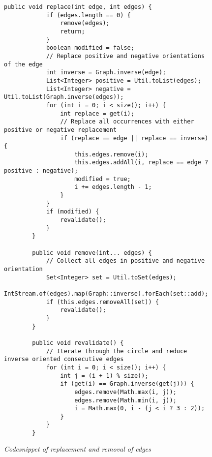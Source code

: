 \lstset{language=Java}
\begin{figure}
    \begin{lstlisting}[frame=single]
        public void replace(int edge, int edges) {
            if (edges.length == 0) {
                remove(edges);
                return;
            }
            boolean modified = false;
            // Replace positive and negative orientations of the edge
            int inverse = Graph.inverse(edge);
            List<Integer> positive = Util.toList(edges);
            List<Integer> negative = Util.toList(Graph.inverse(edges));
            for (int i = 0; i < size(); i++) {
                int replace = get(i);
                // Replace all occurrences with either positive or negative replacement
                if (replace == edge || replace == inverse) {
                    this.edges.remove(i);
                    this.edges.addAll(i, replace == edge ? positive : negative);
                    modified = true;
                    i += edges.length - 1;
                }
            }
            if (modified) {
                revalidate();
            }
        }

        public void remove(int... edges) {
            // Collect all edges in positive and negative orientation
            Set<Integer> set = Util.toSet(edges);
            IntStream.of(edges).map(Graph::inverse).forEach(set::add);
            if (this.edges.removeAll(set)) {
                revalidate();
            }
        }

        public void revalidate() {
            // Iterate through the circle and reduce inverse oriented consecutive edges
            for (int i = 0; i < size(); i++) {
                int j = (i + 1) % size();
                if (get(i) == Graph.inverse(get(j))) {
                    edges.remove(Math.max(i, j));
                    edges.remove(Math.min(i, j));
                    i = Math.max(0, i - (j < i ? 3 : 2));
                }
            }
        }
    \end{lstlisting}
    \caption{\textit{Codesnippet of replacement and removal of edges}}
    \label{fig5}
\end{figure}